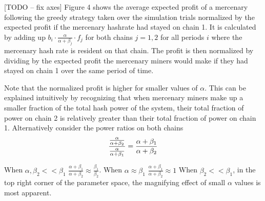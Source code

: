 \documentclass[10pt, preprint]{aastex}
\begin{document}
[TODO -- fix axes]
Figure 4 shows the average expected profit of a mercenary following the greedy strategy taken over the simulation trials normalized by the expected profit if the mercenary hashrate had stayed on chain 1.  It is calculated by adding up $b_i \cdot \frac{\alpha}{\alpha + \beta_j} \cdot f_j$ for both chains $j=1,2$ for all periods $i$ where the mercenary hash rate is resident on that chain.  The profit is then normalized by dividing by the expected profit the mercenary miners would make if they had stayed on chain 1 over the same period of time.  

Note that the normalized profit is higher for smaller values of $\alpha$.  This can be explained intuitively by recognizing that when mercenary miners make up a smaller fraction of the total hash power of the system, their total fraction of power on chain 2 is relatively greater than their total fraction of power on chain 1.  Alternatively consider the power ratios on both chains
$$
\frac{ \frac{\alpha}{\alpha + \beta_2}}{\frac{\alpha}{\alpha + \beta_1}} = \frac{\alpha + \beta_1}{\alpha + \beta_2}\\ 
$$

When $\alpha, \beta_2 << \beta_1$ $\frac{\alpha + \beta_1}{\alpha + \beta_2} \approx \frac{\beta_1}{\beta_2}$.  When $\alpha \approx \beta_1$ $\frac{\alpha + \beta_1}{\alpha + \beta_2} \approx 1$   When $\beta_2 << \beta_1$, in the top right corner of the parameter space, the magnifying effect of small $\alpha$ values is most apparent.
\end{document}
